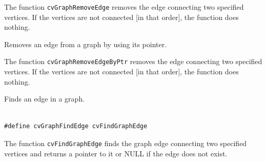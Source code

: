 The function \texttt{cvGraphRemoveEdge} removes the edge connecting two specified vertices. If the vertices are not connected [in that order], the function does nothing.

\label{GraphRemoveEdgeByPtr}

Removes an edge from a graph by using its pointer.


\begin{description}
\end{description}

The function \texttt{cvGraphRemoveEdgeByPtr} removes the edge connecting two specified vertices. If the vertices are not connected [in that order], the function does nothing.

\label{FindGraphEdge}

Finds an edge in a graph.


\begin{lstlisting}

#define cvGraphFindEdge cvFindGraphEdge

\end{lstlisting}

\begin{description}
\end{description}

The function \texttt{cvFindGraphEdge} finds the graph edge connecting two specified vertices and returns a pointer to it or NULL if the edge does not exist.

